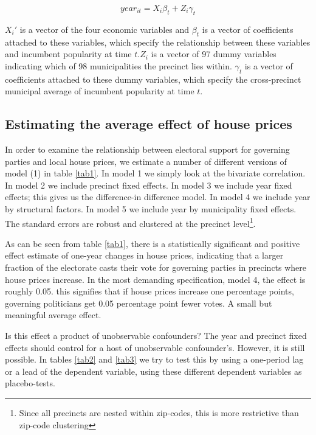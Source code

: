 \documentclass[12pt,a4paper]{article}
\begin{document}
\begin{equation}
year_{it}=X_i\beta_t + Z_i\gamma_t
\end{equation}

 $X_i'$ is a vector of the four economic variables and $\beta_t$ is a vector of coefficients attached to these variables, which specify the relationship between these variables and incumbent popularity at time $t$.$Z_i$ is a vector of 97 dummy variables indicating which of 98 municipalities the precinct lies within. $\gamma_t$ is a vector of coefficients attached to these dummy variables, which specify the cross-precinct municipal average of incumbent popularity at time $t$.


\subsection{Estimating the average effect of house prices}
In order to examine the relationship between electoral support for governing parties and local house prices, we estimate a number of different versions of model (1) in table \ref{tab1}. In model 1 we simply look at the bivariate correlation. In model 2 we include precinct fixed effects. In model 3 we include year fixed effects; this gives us the difference-in difference model. In model 4 we include year by structural factors. In model 5 we include year by municipality fixed effects. The standard errors are robust and clustered at the precinct level\footnote{Since all precincts are nested within zip-codes, this is more restrictive than zip-code clustering}.

As can be seen from table \ref{tab1}, there is a statistically significant and positive effect estimate of one-year changes in house prices, indicating that a larger fraction of the electorate casts their vote for governing parties in precincts where house prices increase. In the most demanding specification, model 4, the effect is roughly 0.05. this signifies that if house prices increase one percentage points, governing politicians get 0.05 percentage point fewer votes. A small but meaningful average effect.




Is this effect a product of unobservable confounders? The year and precinct fixed effects should control for a host of unobservable confounder's. However, it is still possible. In tables \ref{tab2} and \ref{tab3} we try to test this by using a one-period lag or a lead of the dependent variable, using these different dependent variables as placebo-tests.
\end{document}

